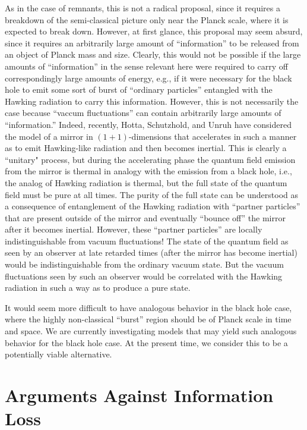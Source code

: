 \documentclass[12pt,nofootinbib,amsmath,amssymb,amsfonts,aps,prd,groupedaddress]{revtex4-1}
\begin{document}
As in the case of remnants, this is not a radical proposal, since it requires a
breakdown of the semi-classical picture only near the Planck scale, where it is
expected to break down. However, at first glance, this proposal may seem absurd,
since it requires an arbitrarily large amount of ``information'' to be released
from an object of Planck mass and size. Clearly, this would not be possible if
the large amounts of ``information'' in the sense relevant here were required to
carry off correspondingly large amounts of energy, e.g., if it were necessary
for the black hole to emit some sort of burst of ``ordinary particles''
entangled with the Hawking radiation to carry this information. However, this is
not necessarily the case because ``vaccum fluctuations'' can contain arbitrarily
large amounts of ``information.'' Indeed, recently, Hotta, Schutzhold, and
Unruh \cite{hsu} have considered the model of a mirror in $(1+1)$-dimensions that
accelerates in such a manner as to emit Hawking-like radiation and then becomes
inertial. This is clearly a ``unitary" process, but during the accelerating phase the 
quantum field emission from the mirror is thermal in analogy with the emission from a black hole,
i.e.,  the analog of Hawking radiation is thermal, but the full state of the quantum
field must be pure at all times. The purity of the full state can be understood
as a consequence of entanglement of the Hawking radiation with ``partner
particles'' that are present outside of the mirror and eventually ``bounce off''
the mirror after it becomes inertial. However, these ``partner particles'' are
locally indistinguishable from vacuum fluctuations! The state of the quantum
field as seen by an observer at late retarded times (after the mirror has become
inertial) would be indistinguishable from the ordinary vacuum state. But the
vacuum fluctuations seen by such an observer would be correlated with the
Hawking radiation in such a way as to produce a pure state. 

It would seem more difficult to have analogous behavior in the black hole case,
where the highly non-classical ``burst'' region should be of Planck scale in
time and space. We are currently investigating models that may yield such
analogous behavior for the black hole case. At the present time, we
consider this to be a potentially viable alternative.


\section{Arguments Against Information Loss} \label{noinfo}
\end{document}
